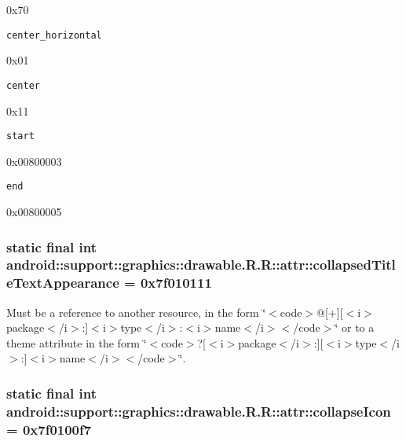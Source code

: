 0x70

{\tt center\_\-horizontal}

0x01

{\tt center}

0x11

{\tt start}

0x00800003

{\tt end}

0x00800005\hypertarget{classandroid_1_1support_1_1graphics_1_1drawable_1_1_r_1_1attr_cfa328445b23e67c53ea67f04c3895ce}{
\subsubsection[{collapsedTitleTextAppearance}]{\setlength{\rightskip}{0pt plus 5cm}static final int android::support::graphics::drawable.R.R::attr::collapsedTitleTextAppearance = 0x7f010111}}
\label{classandroid_1_1support_1_1graphics_1_1drawable_1_1_r_1_1attr_cfa328445b23e67c53ea67f04c3895ce}


Must be a reference to another resource, in the form \char`\"{}$<$code$>$@\mbox{[}+\mbox{]}\mbox{[}$<$i$>$package$<$/i$>$:\mbox{]}$<$i$>$type$<$/i$>$:$<$i$>$name$<$/i$>$$<$/code$>$\char`\"{} or to a theme attribute in the form \char`\"{}$<$code$>$?\mbox{[}$<$i$>$package$<$/i$>$:\mbox{]}\mbox{[}$<$i$>$type$<$/i$>$:\mbox{]}$<$i$>$name$<$/i$>$$<$/code$>$\char`\"{}. \hypertarget{classandroid_1_1support_1_1graphics_1_1drawable_1_1_r_1_1attr_b8ebe4796212f4517938b0d4e8825e40}{
\subsubsection[{collapseIcon}]{\setlength{\rightskip}{0pt plus 5cm}static final int android::support::graphics::drawable.R.R::attr::collapseIcon = 0x7f0100f7}}
\label{classandroid_1_1support_1_1graphics_1_1drawable_1_1_r_1_1attr_b8ebe4796212f4517938b0d4e8825e40}


